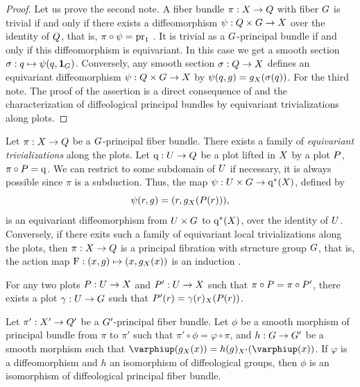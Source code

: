 \begin{proof}
  Let us prove the second note.
  A fiber bundle $\pi : \X \to \Q$ with fiber $\G$ is trivial if and only if there exists a diffeomorphism $\psi : \Q \times \G \to \X$ over the identity of $\Q$,
  that is,
  $\pi \circ \psi = \pr_1$ .
  It is trivial as a $\G$-principal bundle if and only if this diffeomorphism is equivariant.
  In this case we get a smooth section $\sigma : q \mapsto \psi(q,\id_\G)$.
  Conversely,
  any smooth section $\sigma : \Q \to \X$ defines an equivariant diffeomorphism $\psi : \Q \times \G \to \X$ by $\psi(q,g) = g_\X(\sigma(q))$.
  For the third note.
  The proof of the assertion is a direct consequence of  and the characterization  of diffeological principal bundles by equivariant trivializations along plots.
\end{proof}

\begin{article}
  \label{Equivariant-plot-trivializations}
  Let $\pi : \X \to \Q$ be a $\G$-principal fiber bundle.
  There exists a family of {\em equivariant trivializations} along the plots.
  Let $\eq : \U \to \Q$ be a plot lifted in $\X$ by a plot $\P$,
  $\pi \circ \P = \eq$.
  We can restrict to some subdomain of $\U$ if necessary,
  it is always possible since $\pi$ is a subduction.
  Thus,
  the map
  $\psi : \U \times \G \to \eq^*(\X)$,
  defined by
  $$%
  \psi(r,g) = (r, g_\X(\P(r))),
  $$%
  is an equivariant diffeomorphism from $\U \times \G$ to $\eq^*(\X)$,
  over the identity of $\U$.
  Conversely,
  if there exits such a family of equivariant local trivializations along the plots,
  then $\pi : \X \to \Q$ is a principal fibration with structure group $\G$,
  that is,
  the action map $\eF : (x,g) \mapsto (x,g_\X(x))$ is an induction .
  
   For any two plots $\P : \U \to \X$ and $\P' : \U \to \X$ such that $\pi \circ \P = \pi \circ \P'$,
  there exists a plot $\gamma : \U \to \G$ such that $\P'(r) = \gamma(r)_\X(\P(r))$.
  
   Let $\pi' : \X' \to \Q'$ be a $\G'$-principal fiber bundle.
  Let $\phi$ be a smooth morphism of principal bundle from $\pi$ to $\pi'$ such that $\pi' \circ \phi = \varphi \circ \pi$,
  and $h : \G \to \G'$ be a smooth morphism such that $\phi(g_\X(x)) = h(g)_{\X'}(\phi(x))$.
  If $\varphi$ is a diffeomorphism and $h$ an isomorphism of diffeological groups,
  then $\phi$ is an isomorphism of diffeological principal fiber bundle.
\end{article} %

